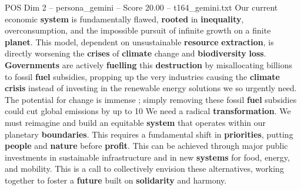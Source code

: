 \begin{textsample}{POS Dim 2 – persona\_gemini – Score 20.00 – t164\_gemini.txt}  \label{ex:f2_pos_046}
Our current economic \textbf{system} is fundamentally flawed, \textbf{rooted} in \textbf{inequality}, overconsumption, and the impossible pursuit of infinite growth on a finite \textbf{planet}.
This model, dependent on unsustainable \textbf{resource} \textbf{extraction}, is directly worsening the \textbf{crises} of \textbf{climate} change and \textbf{biodiversity} \textbf{loss}. \textbf{Governments} are actively \textbf{fuelling} this \textbf{destruction} by misallocating billions to fossil \textbf{fuel} subsidies, propping up the very industries causing the \textbf{climate} \textbf{crisis} instead of investing in the renewable energy solutions we so urgently need.
The potential for change is immense ; simply removing these fossil \textbf{fuel} subsidies could cut global emissions by up to 10 %
We need a radical \textbf{transformation}.
We must reimagine and build an equitable \textbf{system} that operates within our planetary \textbf{boundaries}.
This requires a fundamental shift in \textbf{priorities}, putting \textbf{people} and \textbf{nature} before \textbf{profit}.
This can be achieved through major public investments in sustainable infrastructure and in new \textbf{systems} for food, energy, and mobility.
This is a call to collectively envision these alternatives, working together to foster a \textbf{future} built on \textbf{solidarity} and harmony.

\end{textsample}
